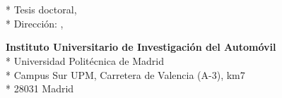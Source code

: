 \cleardoublepage
\begin{fullwidth}
~\vfill
\thispagestyle{empty}
\setlength{\parindent}{0pt}
\setlength{\parskip}{\baselineskip}
\phdauthor

\par{
	\textit{\phdtitle}\\*
	Tesis doctoral, \thedate\\*
	Dirección: \thanklessadvisorone, \thanklessadvisortwo
	}

\par{
	\textbf{Instituto Universitario de Investigación del Automóvil}\\*
	Universidad Politécnica de Madrid\\*
	Campus Sur UPM, Carretera de Valencia (A-3), km7\\*
	28031 Madrid
}

\par{
	\doclicenseThis
}

\end{fullwidth}